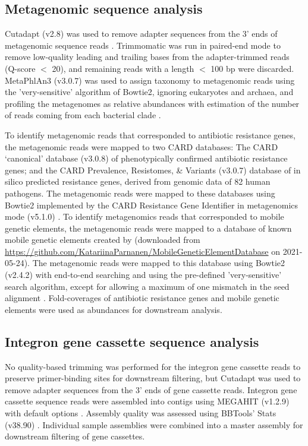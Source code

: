 \subsection{Metagenomic sequence analysis}

Cutadapt (v2.8) was used to remove adapter sequences from the 3’ ends of metagenomic sequence reads \parencite{Martin.2011}.
Trimmomatic was run in paired-end mode to remove low-quality leading and trailing bases from the adapter-trimmed reads (Q-score $<$ 20), and remaining reads with a length $<$ 100 bp were discarded.
MetaPhlAn3 (v3.0.7) was used to assign taxonomy to metagenomic reads using the 'very-sensitive' algorithm of Bowtie2, ignoring eukaryotes and archaea, and profiling the metagenomes as relative abundances with estimation of the number of reads coming from each bacterial clade \parencite{Beghini.2020}.

To identify metagenomic reads that corresponded to antibiotic resistance genes, the metagenomic reads were mapped to two \gls{CARD} databases:
The \gls{CARD} ‘canonical’ database (v3.0.8) of phenotypically confirmed antibiotic resistance genes; and the \gls{CARD} Prevalence, Resistomes, \& Variants (v3.0.7) database of in silico predicted resistance genes, derived from genomic data of 82 human pathogens.
The metagenomic reads were mapped to these databases using Bowtie2 implemented by the \gls{CARD} Resistance Gene Identifier in metagenomics mode (v5.1.0) \parencite{Alcock.2020}.
To identify metagenomics reads that corresponded to mobile genetic elements, the metagenomic reads were mapped to a database of known mobile genetic elements created by \cite{Parnanen.2018} (downloaded from \url{https://github.com/KatariinaParnanen/MobileGeneticElementDatabase} on 2021-05-24).
The metagenomic reads were mapped to this database using Bowtie2 (v2.4.2) with end-to-end searching and using the pre-defined 'very-sensitive' search algorithm, except for allowing a maximum of one mismatch in the seed alignment \parencite{Langmead.2012}.
Fold-coverages of antibiotic resistance genes and mobile genetic elements were used as abundances for downstream analysis.

\subsection{Integron gene cassette sequence analysis} \label{section:cassette-sequence-analysis}

No quality-based trimming was performed for the integron gene cassette reads to preserve primer-binding sites for downstream filtering, but Cutadapt was used to remove adapter sequences from the 3’ ends of gene cassette reads.
Integron gene cassette sequence reads were assembled into contigs using MEGAHIT (v1.2.9) with default options \parencite{Li.2015c}.
Assembly quality was assessed using BBTools’ Stats (v38.90) \parencite{Bushnell.2016}.
Individual sample assemblies were combined into a master assembly for downstream filtering of gene cassettes.

